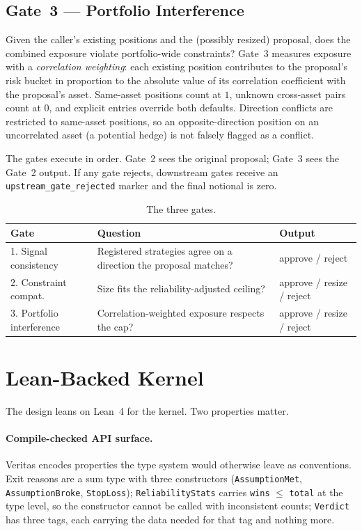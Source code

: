 \documentclass[11pt, a4paper]{article}
\begin{document}
\subsection{Gate~3 --- Portfolio Interference}
Given the caller's existing positions and the (possibly resized)
proposal, does the combined exposure violate portfolio-wide
constraints? Gate~3 measures exposure with a \emph{correlation
weighting}: each existing position contributes to the proposal's
risk bucket in proportion to the absolute value of its correlation
coefficient with the proposal's asset. Same-asset positions count at
$1$, unknown cross-asset pairs count at $0$, and explicit entries
override both defaults. Direction conflicts are restricted to
same-asset positions, so an opposite-direction position on an
uncorrelated asset (a potential hedge) is not falsely flagged as a
conflict.

\medskip

\noindent The gates execute in order. Gate~2 sees the original proposal;
Gate~3 sees the Gate~2 output. If any gate rejects, downstream gates
receive an \texttt{upstream\_gate\_rejected} marker and the final
notional is zero.

\begin{table}[h]
\small
\begin{tabularx}{\linewidth}{@{}lXl@{}}
\toprule
Gate & Question & Output \\
\midrule
1. Signal consistency
  & Registered strategies agree on a direction the proposal matches?
  & approve / reject \\
2. Constraint compat.
  & Size fits the reliability-adjusted ceiling?
  & approve / resize / reject \\
3. Portfolio interference
  & Correlation-weighted exposure respects the cap?
  & approve / resize / reject \\
\bottomrule
\end{tabularx}
\caption{The three gates.}
\label{tab:gates}
\end{table}

\section{Lean-Backed Kernel}
\label{sec:lean}

The design leans on Lean~4 for the kernel. Two properties matter.

\paragraph{Compile-checked API surface.} Veritas encodes properties the
type system would otherwise leave as conventions. Exit reasons are a sum
type with three constructors (\texttt{AssumptionMet},
\texttt{AssumptionBroke}, \texttt{StopLoss}); \texttt{ReliabilityStats}
carries \texttt{wins} $\leq$ \texttt{total} at the type level, so the
constructor cannot be called with inconsistent counts; \texttt{Verdict}
has three tags, each carrying the data needed for that tag and nothing
more.
\end{document}
